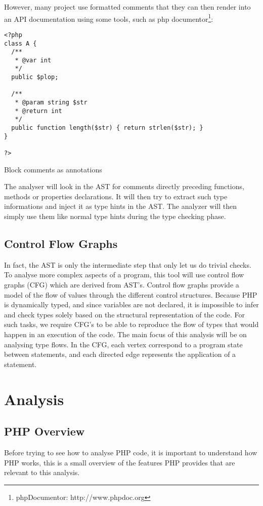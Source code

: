 \documentclass[a4paper]{article}
\begin{document}
However, many project use formatted comments that they can then
render into an API documentation using some tools, such as php
documentor\footnote{phpDocumentor: http://www.phpdoc.org}:

\begin{listing}
  \begin{verbatim}
<?php
class A {
  /**
   * @var int
   */
  public $plop;

  /**
   * @param string $str
   * @return int
   */
  public function length($str) { return strlen($str); }
}

?>
\end{verbatim}
  \caption{Block comments as annotations}
\end{listing}

The analyser will look in the AST for comments directly preceding functions,
methods or properties declarations. It will then try to extract such type
informations and inject it as type hints in the AST. The analyzer will then
simply use them like normal type hints during the type checking phase.

\subsection{Control Flow Graphs}
In fact, the AST is only the intermediate step that only let us do trivial
checks. To analyse more complex aspects of a program, this tool will use
control flow graphs (CFG) which are derived from AST's.  Control flow graphs
provide a model of the flow of values through the different control structures.
Because PHP is dynamically typed, and since variables are not declared, it is
impossible to infer and check types solely based on the structural
representation of the code. For such tasks, we require CFG's to be able to
reproduce the flow of types that would happen in an execution of the code. The
main focus of this analysis will be on analysing type flows. In the CFG, each
vertex correspond to a program state between statements, and each directed edge
represents the application of a statement.

\section{Analysis}
\subsection{PHP Overview}
Before trying to see how to analyse PHP code, it is important to understand how
PHP works, this is a small overview of the features PHP provides that are
relevant to this analysis.
\end{document}
